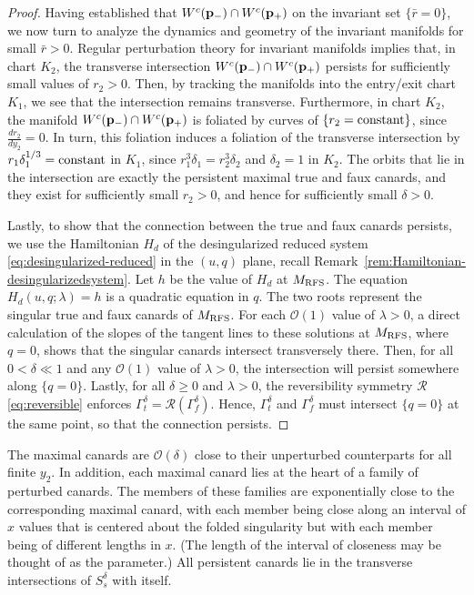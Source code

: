 \documentclass[11pt]{article}
\numberwithin{equation}{section}
\begin{document}
\begin{proof}
Having established that $W^c({\bf p}_-) \cap W^c({\bf p}_+)$
on the invariant set $\{ \bar r = 0 \}$, we now turn to analyze the dynamics and geometry of the invariant manifolds for small $\bar r > 0$. 
Regular perturbation theory for invariant manifolds implies that, in chart $K_2$, the transverse intersection $W^c({\bf p}_-) \cap W^c({\bf p}_+)$ persists for sufficiently small values of $r_2>0$.
Then, by tracking the manifolds into the entry/exit chart $K_1$, we see that the intersection remains transverse.
Furthermore, in chart $K_2$, the manifold $W^c({\bf p}_-) \cap W^c({\bf p}_+)$ is foliated by curves of $\{ r_2= {\rm constant} \}$, since $\tfrac{dr_2}{dy_2}=0$.
In turn, this foliation induces a foliation of the transverse intersection by $r_1 \delta_1^{1/3}={\rm constant}$ in $K_1$, since $r_1^3 \delta_1 = r_2^3 \delta_2$ and $\delta_2=1$ in $K_2$.
The orbits that lie in the intersection are exactly the persistent maximal true and faux canards, and they exist for sufficiently small $r_2>0$, and hence for sufficiently small $\delta>0$.

Lastly, to show that the connection between the true and faux canards persists, we use the Hamiltonian $H_d$ of the desingularized reduced system \eqref{eq:desingularized-reduced} in the $(u,q)$ plane, recall Remark~\ref{rem:Hamiltonian-desingularizedsystem}.
Let $h$ be the value of $H_d$ at 
$M_{\rm RFS}$.
The equation $H_d(u,q;\lambda)=h$ is a quadratic equation in $q$. 
The two roots represent the singular true and faux canards of $M_{\rm RFS}$.
For each $\mathcal{O}(1)$ value of $\lambda > 0$, a direct calculation of the slopes of the tangent lines to these solutions
at $M_{\rm RFS}$, where $q=0$, shows that the singular canards intersect transversely there.
Then, for all $0< \delta \ll 1$ and any $\mathcal{O}(1)$ value of $\lambda>0$, the intersection will persist somewhere along $\{ q = 0 \}$.
Lastly, for all $\delta \ge 0$ and $\lambda>0$, the reversibility symmetry ${\mathcal R}$ \eqref{eq:reversible} enforces $\Gamma_t^\delta = {\mathcal R}(\Gamma_f^\delta)$.
Hence, $\Gamma^\delta_t$ and $\Gamma^\delta_f$ must intersect $\{ q=0 \}$ at the same point, so that the connection persists.
\end{proof} 

\medskip
\noindent 
The maximal canards are $\mathcal{O}(\delta)$ close to their unperturbed counterparts for all finite $y_2$.
In addition, each maximal canard lies at the heart of a family of perturbed canards.
The members of these families are exponentially close to the corresponding maximal canard, with each member being close along an interval of $x$ values that is centered about the folded singularity but with each member being of different lengths in $x$. 
(The length of 
the interval of closeness may be thought of as the parameter.)
All persistent canards lie in the transverse intersections of $S_s^\delta$  with itself.
\end{document}
